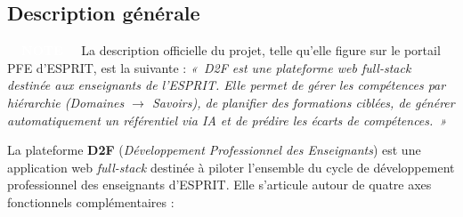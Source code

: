 \documentclass[12pt,a4paper]{report}
\newcommand{\notelabel}{\colorbox{espritblue}{\textcolor{white}{\bfseries\small~~NOTE~~}}\;}
\begin{document}
\subsection{Description générale}

\begin{noteframe}
\notelabel{} La description officielle du projet, telle qu'elle figure sur le
portail PFE d'ESPRIT, est la suivante : \textit{«~D2F est une plateforme web
\textit{full-stack} destinée aux enseignants de l'ESPRIT. Elle permet de gérer
les compétences par hiérarchie (Domaines $\rightarrow$ Savoirs), de planifier
des formations ciblées, de générer automatiquement un référentiel via IA et de
prédire les écarts de compétences.~»}
\end{noteframe}

La plateforme \textbf{D2F} (\textit{Développement Professionnel des Enseignants})
est une application web \textit{full-stack} destinée à piloter l'ensemble du
cycle de développement professionnel des enseignants d'ESPRIT. Elle s'articule
autour de quatre axes fonctionnels complémentaires :
\end{document}

